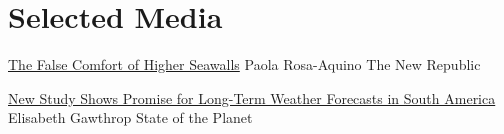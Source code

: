 \section{Selected Media}

{\href{https://newrepublic.com/article/155519/false-comfort-higher-seawalls}
	{The False Comfort of Higher Seawalls}}
{Paola Rosa-Aquino}
{The New Republic}
{}
{}

{\href{https://blogs.ei.columbia.edu/2018/08/06/subseasonal-weather-forecasts-paraguay/}
	{New Study Shows Promise for Long-Term Weather Forecasts in South America}}
{Elisabeth Gawthrop}
{State of the Planet}
{}
{}
